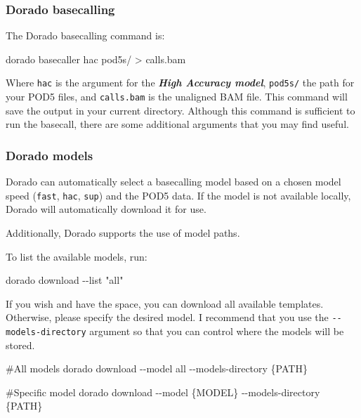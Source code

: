 \documentclass[
  letterpaper,
  DIV=11,
  numbers=noendperiod]{scrreprt}
\newenvironment{Shaded}{\begin{snugshade}}{\end{snugshade}}
\newcommand{\AttributeTok}[1]{\textcolor[rgb]{0.40,0.45,0.13}{#1}}
\newcommand{\CommentTok}[1]{\textcolor[rgb]{0.37,0.37,0.37}{#1}}
\newcommand{\ExtensionTok}[1]{\textcolor[rgb]{0.00,0.23,0.31}{#1}}
\newcommand{\NormalTok}[1]{\textcolor[rgb]{0.00,0.23,0.31}{#1}}
\newcommand{\OperatorTok}[1]{\textcolor[rgb]{0.37,0.37,0.37}{#1}}
\newcommand{\StringTok}[1]{\textcolor[rgb]{0.13,0.47,0.30}{#1}}
\begin{document}
\subsubsection{Dorado basecalling}\label{dorado-basecalling}

The Dorado basecalling command is:

\begin{Shaded}
\begin{Highlighting}[]
\ExtensionTok{dorado}\NormalTok{ basecaller hac pod5s/ }\OperatorTok{\textgreater{}}\NormalTok{ calls.bam}
\end{Highlighting}
\end{Shaded}

Where \texttt{hac} is the argument for the \textbf{\emph{High Accuracy
model}}, \texttt{pod5s/} the path for your POD5 files, and
\texttt{calls.bam} is the unaligned BAM file. This command will save the
output in your current directory. Although this command is sufficient to
run the basecall, there are some additional arguments that you may find
useful.

\subsubsection{Dorado models}\label{dorado-models}

Dorado can automatically select a basecalling model based on a chosen
model speed (\texttt{fast}, \texttt{hac}, \texttt{sup}) and the POD5
data. If the model is not available locally, Dorado will automatically
download it for use.

Additionally, Dorado supports the use of model paths.

To list the available models, run:

\begin{Shaded}
\begin{Highlighting}[]
\ExtensionTok{dorado}\NormalTok{ download }\AttributeTok{{-}{-}list} \StringTok{"all"}
\end{Highlighting}
\end{Shaded}

If you wish and have the space, you can download all available
templates. Otherwise, please specify the desired model. I recommend that
you use the \texttt{-\/-models-directory} argument so that you can
control where the models will be stored.

\begin{Shaded}
\begin{Highlighting}[]
\CommentTok{\#All models}
\ExtensionTok{dorado}\NormalTok{ download }\AttributeTok{{-}{-}model}\NormalTok{ all }\AttributeTok{{-}{-}models{-}directory}\NormalTok{ \{PATH\}}

\CommentTok{\#Specific model}
\ExtensionTok{dorado}\NormalTok{ download }\AttributeTok{{-}{-}model}\NormalTok{ \{MODEL\} }\AttributeTok{{-}{-}models{-}directory}\NormalTok{ \{PATH\}}
\end{Highlighting}
\end{Shaded}
\end{document}
